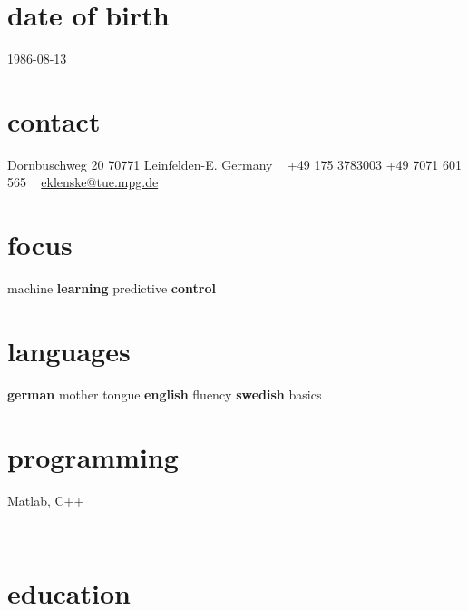 \documentclass[]{k-cv} %
\begin{document}


\begin{aside} %
\section{date of birth}
\color{gray}1986-08-13
\section{contact}
\color{gray}Dornbuschweg 20
70771 Leinfelden-E.
Germany
~
+49 175 3783003
+49 7071 601 565
~
\href{mailto:eklenske@tue.mpg.de}{eklenske@tue.mpg.de}
\section{focus}
machine {\bfseries learning}
predictive {\bfseries control}
\section{languages}
{\bfseries german} mother tongue
{\bfseries english} fluency
{\bfseries swedish} basics
\section{programming}
Matlab, C++
\end{aside}

\
\section{education}\normalfont
\end{document}
